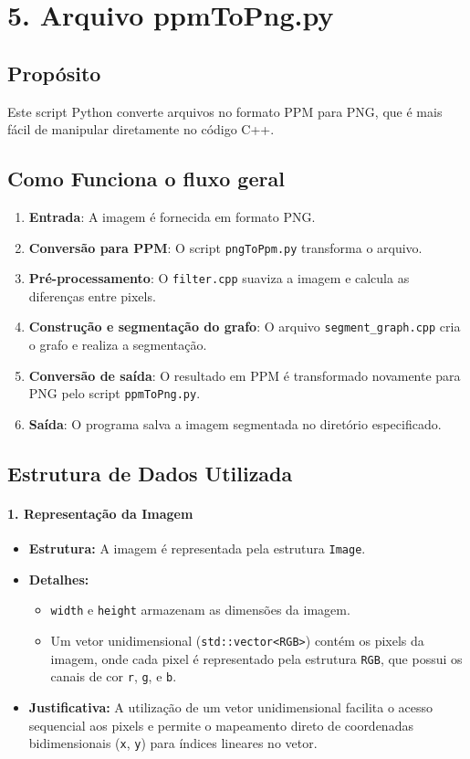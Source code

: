 \documentclass[12pt]{article}
\begin{document}
\section*{5. Arquivo ppmToPng.py}
\subsection*{Propósito}
Este script Python converte arquivos no formato PPM para PNG, que é mais fácil de manipular diretamente no código C++.

\subsection*{Como Funciona o fluxo geral}
\begin{enumerate}
    \item \textbf{Entrada}: A imagem é fornecida em formato PNG.
    \item \textbf{Conversão para PPM}: O script \texttt{pngToPpm.py} transforma o arquivo.
    \item \textbf{Pré-processamento}: O \texttt{filter.cpp} suaviza a imagem e calcula as diferenças entre pixels.
\item \textbf{Construção e segmentação do grafo}: O arquivo \texttt{segment\_graph.cpp} cria o grafo e realiza a segmentação.
\item \textbf{Conversão de saída}: O resultado em PPM é transformado novamente para PNG pelo script \texttt{ppmToPng.py}.
\item \textbf{Saída}: O programa salva a imagem segmentada no diretório especificado.
\end{enumerate}

\subsection*{Estrutura de Dados Utilizada}

\paragraph*{\textbf{1. Representação da Imagem}}
\begin{itemize}
    \item \textbf{Estrutura:} A imagem é representada pela estrutura \texttt{Image}.
    \item \textbf{Detalhes:}
    \begin{itemize}
        \item \texttt{width} e \texttt{height} armazenam as dimensões da imagem.
        \item Um vetor unidimensional (\texttt{std::vector<RGB>}) contém os pixels da imagem, onde cada pixel é representado pela estrutura \texttt{RGB}, que possui os canais de cor \texttt{r}, \texttt{g}, e \texttt{b}.
    \end{itemize}
    \item \textbf{Justificativa:} A utilização de um vetor unidimensional facilita o acesso sequencial aos pixels e permite o mapeamento direto de coordenadas bidimensionais (\texttt{x}, \texttt{y}) para índices lineares no vetor.
\end{itemize}
\end{document}
